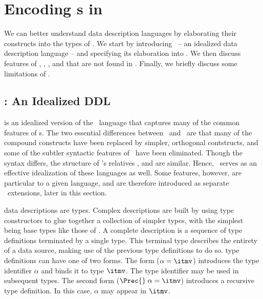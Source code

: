 \section{Encoding \ddl{}s in \ddc{}}
\label{sec:ddc-encodings}


We can better understand data description languages by elaborating
their constructs into the types of \ddc{}. We start by introducing
\ipads\ -- an idealized data description language -- and specifying
its elaboration into \ddc. We then discuss features of \padsc{}, \padsml{},
\datascript{}, and \packettypes{} that are not found in \ipads{}.
Finally, we briefly discuss some limitations of \ddc{}.

\subsection{\ipads{}:  An Idealized DDL}
\label{sec:ddc-ipads}

\ipads{} is an idealized version of the \padsc\ language that captures
many of the common features of \ddl{}s. %
The two essential differences between \padsc\ and \ipads\ are
that many of the compound constructs have been replaced by simpler,
orthogonal contstructs, and some of the subtler syntactic features of
\padsc\ have been eliminated. Though the syntax differs, the structure
of \padsc{}'s relatives \padsml{}, \packettypes{} and \datascript{}
are similar. Hence, \ipads\ serves as an effective idealization of
these languages as well. Some features, however, are particular to a
given language, and are therefore introduced as separate \ipads\
extensions, later in this section.

\ipads{} data descriptions are types.  Complex \ipads{} descriptions
are built by using type constructors to glue together a collection of
simpler types, with the simplest being base types like those of
\padsml{}. A complete \ipads{} description
is a sequence of type definitions terminated by a single type.  This
terminal type describes the entirety of a data source, making use of
the previous type definitions to do so.  \ipads{} type definitions can
have one of two forms.  The form ($\alpha = \itmv$) introduces the
type identifier $\alpha$ and binds it to \ipads{} type $\itmv$.  The
type identifier may be used in subsequent types.  The second form
($\Prec{}\; \alpha = \itmv$) introduces a recursive type definition.
In this case, $\alpha$ may appear in $\itmv$.

